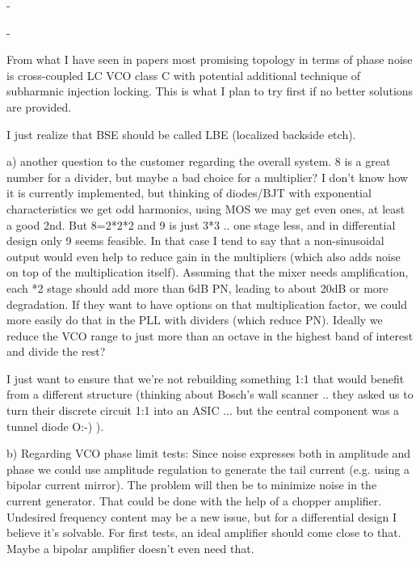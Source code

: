 \documentclass{article}
\begin{document}
\begin{question}
	-
\end{question}

\begin{question}
	-
\end{question}

From what I have seen in papers  most promising topology in terms of phase noise is cross-coupled LC VCO class C with potential additional technique of subharmnic injection locking.
This is what I plan to try first if no better solutions are provided.

I just realize that BSE should be called LBE (localized backside etch).

a)
another question to the customer regarding the overall system. 8 is a great number for a divider, but maybe a bad choice for a multiplier? I don't know how it is currently implemented, but thinking of diodes/BJT with exponential characteristics we get odd harmonics, using MOS we may get even ones, at least a good 2nd. But 8=2*2*2 and 9 is just 3*3 .. one stage less, and in differential design only 9 seems feasible. In that case I tend to say that a non-sinusoidal output would even help to reduce gain in the multipliers (which also adds noise on top of the multiplication itself). Assuming that the mixer needs amplification, each *2 stage should add more than 6dB PN, leading to about 20dB or more degradation. If they want to have options on that multiplication factor, we could more easily do that in the PLL with dividers (which reduce PN). Ideally we reduce the VCO range to just more than an octave in the highest band of interest and divide the rest?

I just want to ensure that we're not rebuilding something 1:1 that would benefit from a different structure (thinking about Bosch's wall scanner .. they asked us to turn their discrete circuit 1:1 into an ASIC ... but the central component was a tunnel diode O:-) ).

b)
Regarding VCO phase limit tests:
Since noise expresses both in amplitude and phase we could use amplitude regulation to generate the tail current (e.g. using a bipolar current mirror). The problem will then be to minimize noise in the current generator. That could be done with the help of a chopper amplifier. Undesired frequency content may be a new issue, but for a differential design I believe it's solvable. For first tests, an ideal amplifier should come close to that. Maybe a bipolar amplifier doesn't even need that. 
\end{document}
